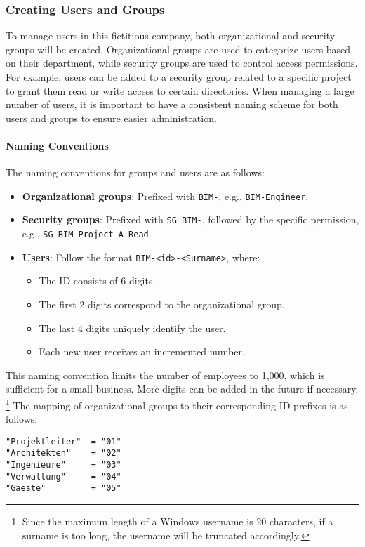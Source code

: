 \documentclass[a4paper]{article}
\newcommand{\abc}{\hfill \break}
\begin{document}
\subsubsection{Creating Users and Groups}
To manage users in this fictitious company, both organizational and security groups will be created.\abc
Organizational groups are used to categorize users based on their department, while security groups are used to control access permissions. For example, users can be added to a security group related to a specific project to grant them read or write access to certain directories.\abc
When managing a large number of users, it is important to have a consistent naming scheme for both users and groups to ensure easier administration.
\paragraph{Naming Conventions}\abc
The naming conventions for groups and users are as follows:
\begin{itemize}
    \item \textbf{Organizational groups}: Prefixed with \texttt{BIM-}, e.g., \texttt{BIM-Engineer}.
    \item \textbf{Security groups}: Prefixed with \texttt{SG\_BIM-}, followed by the specific permission, e.g., \texttt{SG\_BIM-Project\_A\_Read}.
    \item \textbf{Users}: Follow the format \texttt{BIM-<id>-<Surname>}, where:
    \begin{itemize}
        \item The ID consists of 6 digits.
        \item The first 2 digits correspond to the organizational group.
        \item The last 4 digits uniquely identify the user.
        \item Each new user receives an incremented number.
    \end{itemize}
\end{itemize}
This naming convention limits the number of employees to 1,000, which is sufficient for a small business. More digits can be added in the future if necessary.  
\footnote{Since the maximum length of a Windows username is 20 characters, if a surname is too long, the username will be truncated accordingly.}
The mapping of organizational groups to their corresponding ID prefixes is as follows:
\begin{verbatim}
"Projektleiter"  = "01"
"Architekten"    = "02"
"Ingenieure"     = "03"
"Verwaltung"     = "04"
"Gaeste"         = "05"
\end{verbatim}
\newpage
\end{document}
